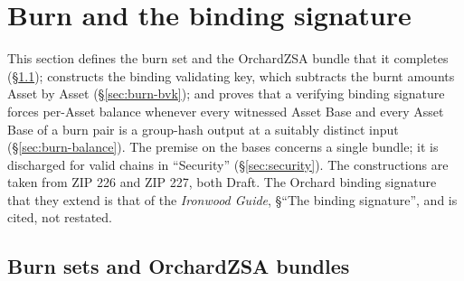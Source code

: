 \documentclass[11pt,a4paper]{article}
\theoremstyle{definition}
\begin{document}
\section{Burn and the binding signature}\label{sec:burn}

This section defines the burn set and the OrchardZSA bundle that it
completes (\S\ref{sec:burn-set}); constructs the binding validating key,
which subtracts the burnt amounts Asset by Asset (\S\ref{sec:burn-bvk}); and
proves that a verifying binding signature forces per-Asset balance whenever
every witnessed Asset Base and every Asset Base of a burn pair is a
group-hash output at a suitably distinct input (\S\ref{sec:burn-balance}).
The premise on the bases concerns a single bundle; it is discharged for
valid chains in ``Security'' (\S\ref{sec:security}). The constructions are
taken from ZIP 226 and ZIP 227, both Draft. The Orchard binding signature
that they extend is that of the \emph{Ironwood Guide}, \S``The binding
signature'', and is cited, not restated.

\subsection{Burn sets and OrchardZSA bundles}\label{sec:burn-set}
\end{document}
